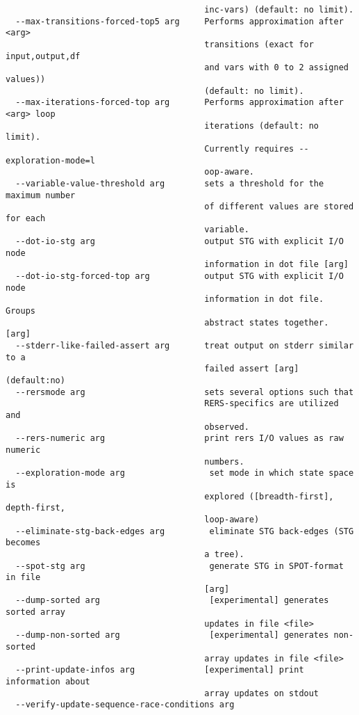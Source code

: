 \documentclass[natbib]{article}
\begin{document}
\begin{verbatim}
                                        inc-vars) (default: no limit).
  --max-transitions-forced-top5 arg     Performs approximation after <arg> 
                                        transitions (exact for input,output,df 
                                        and vars with 0 to 2 assigned values)) 
                                        (default: no limit).
  --max-iterations-forced-top arg       Performs approximation after <arg> loop
                                        iterations (default: no limit). 
                                        Currently requires --exploration-mode=l
                                        oop-aware.
  --variable-value-threshold arg        sets a threshold for the maximum number
                                        of different values are stored for each
                                        variable.
  --dot-io-stg arg                      output STG with explicit I/O node 
                                        information in dot file [arg]
  --dot-io-stg-forced-top arg           output STG with explicit I/O node 
                                        information in dot file. Groups 
                                        abstract states together. [arg]
  --stderr-like-failed-assert arg       treat output on stderr similar to a 
                                        failed assert [arg] (default:no)
  --rersmode arg                        sets several options such that 
                                        RERS-specifics are utilized and 
                                        observed.
  --rers-numeric arg                    print rers I/O values as raw numeric 
                                        numbers.
  --exploration-mode arg                 set mode in which state space is 
                                        explored ([breadth-first], depth-first,
                                        loop-aware)
  --eliminate-stg-back-edges arg         eliminate STG back-edges (STG becomes 
                                        a tree).
  --spot-stg arg                         generate STG in SPOT-format in file 
                                        [arg]
  --dump-sorted arg                      [experimental] generates sorted array 
                                        updates in file <file>
  --dump-non-sorted arg                  [experimental] generates non-sorted 
                                        array updates in file <file>
  --print-update-infos arg              [experimental] print information about 
                                        array updates on stdout
  --verify-update-sequence-race-conditions arg

\end{verbatim}
\end{document}
